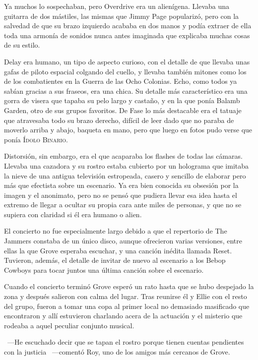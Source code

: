 Ya muchos lo sospechaban, pero Overdrive era un alienígena. Llevaba una guitarra de dos mástiles, las mismas que Jimmy Page popularizó, pero con la salvedad de que su brazo izquierdo acababa en dos manos y podía extraer de ella toda una armonía de sonidos nunca antes imaginada que explicaba muchas cosas de su estilo.

Delay era humano, un tipo de aspecto curioso, con el detalle de que llevaba unas gafas de piloto espacial colgando del cuello, y llevaba también mitones como los de los combatientes en la Guerra de las Ocho Colonias. Echo, como todos ya sabían gracias a sus fraseos, era una chica. Su detalle más característico era una gorra de visera que tapaba su pelo largo y castaño, y en la que ponía Balamb Garden, otro de sus grupos favoritos. De Fase lo más destacable era el tatuaje que atravesaba todo su brazo derecho, difícil de leer dado que no paraba de moverlo arriba y abajo, baqueta en mano, pero que luego en fotos pudo verse que ponía \textsc{Ídolo Binario}.

Distorsión, sin embargo, era el que acaparaba los flashes de todas las cámaras. Llevaba una cazadora y su rostro estaba cubierto por un holograma que imitaba la nieve de una antigua televisión estropeada, casero y sencillo de elaborar pero más que efectista sobre un escenario. Ya era bien conocida su obsesión por la imagen y el anonimato, pero no se pensó que pudiera llevar esa idea hasta el extremo de llegar a ocultar su propia cara ante miles de personas, y que no se supiera con claridad si él era humano o alien.

El concierto no fue especialmente largo debido a que el repertorio de The Jammers constaba de un único disco, aunque ofrecieron varias versiones, entre ellas la que Grove esperaba escuchar, y una canción inédita llamada Reset. Tuvieron, además, el detalle de invitar de nuevo al escenario a los Bebop Cowboys para tocar juntos una última canción sobre el escenario.

Cuando el concierto terminó Grove esperó un rato hasta que se hubo despejado la zona y después salieron con calma del lugar. Tras reunirse él y Ellie con el resto del grupo, fueron a tomar una copa al primer local no demasiado masificado que encontraron y allí estuvieron charlando acera de la actuación y el misterio que rodeaba a aquel peculiar conjunto musical.

~---He escuchado decir que se tapan el rostro porque tienen cuentas pendientes con la justicia ~---comentó Roy, uno de los amigos más cercanos de Grove.

